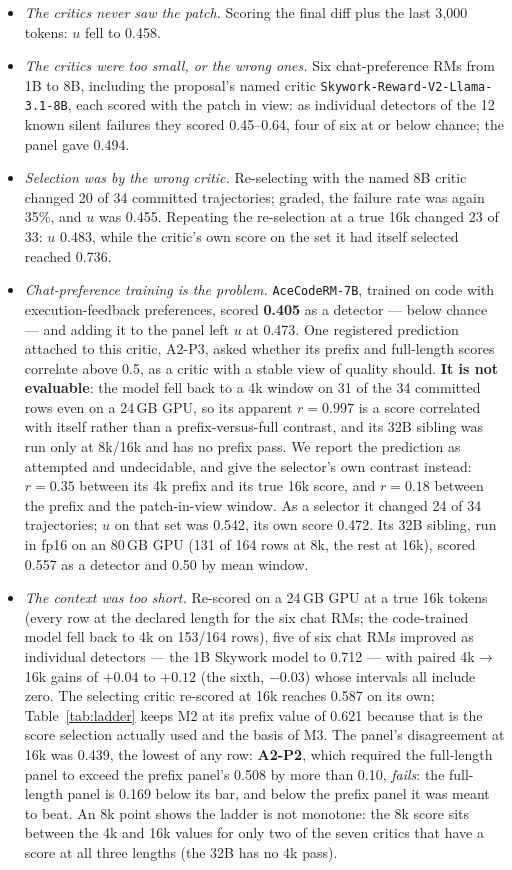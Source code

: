 \documentclass[11pt]{article}
\begin{document}
\begin{itemize}[leftmargin=1.2em,itemsep=1pt]
\item \emph{The critics never saw the patch.} Scoring the final diff plus the last 3{,}000 tokens: $u$ fell to 0.458.
\item \emph{The critics were too small, or the wrong ones.} Six chat-preference RMs from 1B to 8B, including the proposal's named critic \texttt{Skywork-Reward-V2-\allowbreak Llama-3.1-8B}, each scored with the patch in view: as individual detectors of the 12 known silent failures they scored 0.45--0.64, four of six at or below chance; the panel gave 0.494.
\item \emph{Selection was by the wrong critic.} Re-selecting with the named 8B critic changed 20 of 34 committed trajectories; graded, the failure rate was again 35\%, and $u$ was 0.455. Repeating the re-selection at a true 16k changed 23 of 33: $u$ 0.483, while the critic's own score on the set it had itself selected reached 0.736.
\item \emph{Chat-preference training is the problem.} \texttt{AceCodeRM-7B}, trained on code with execution-feedback preferences, scored \textbf{0.405} as a detector --- below chance --- and adding it to the panel left $u$ at 0.473. One registered prediction attached to this critic, A2-P3, asked whether its prefix and full-length scores correlate above 0.5, as a critic with a stable view of quality should. \textbf{It is not evaluable}: the model fell back to a 4k window on 31 of the 34 committed rows even on a 24\,GB GPU, so its apparent $r=0.997$ is a score correlated with itself rather than a prefix-versus-full contrast, and its 32B sibling was run only at 8k/16k and has no prefix pass. We report the prediction as attempted and undecidable, and give the selector's own contrast instead: $r=0.35$ between its 4k prefix and its true 16k score, and $r=0.18$ between the prefix and the patch-in-view window. As a selector it changed 24 of 34 trajectories; $u$ on that set was 0.542, its own score 0.472. Its 32B sibling, run in fp16 on an 80\,GB GPU (131 of 164 rows at 8k, the rest at 16k), scored 0.557 as a detector and 0.50 by mean window.
\item \emph{The context was too short.} Re-scored on a 24\,GB GPU at a true 16k tokens (every row at the declared length for the six chat RMs; the code-trained model fell back to 4k on 153/164 rows), five of six chat RMs improved as individual detectors --- the 1B Skywork model to 0.712 --- with paired 4k$\to$16k gains of $+0.04$ to $+0.12$ (the sixth, $-0.03$) whose intervals all include zero. The selecting critic re-scored at 16k reaches 0.587 on its own; Table~\ref{tab:ladder} keeps M2 at its prefix value of 0.621 because that is the score selection actually used and the basis of M3. The panel's disagreement at 16k was 0.439, the lowest of any row: \textbf{A2-P2}, which required the full-length panel to exceed the prefix panel's 0.508 by more than 0.10, \emph{fails}: the full-length panel is 0.169 below its bar, and below the prefix panel it was meant to beat. An 8k point shows the ladder is not monotone: the 8k score sits between the 4k and 16k values for only two of the seven critics that have a score at all three lengths (the 32B has no 4k pass).

\end{itemize}
\end{document}

